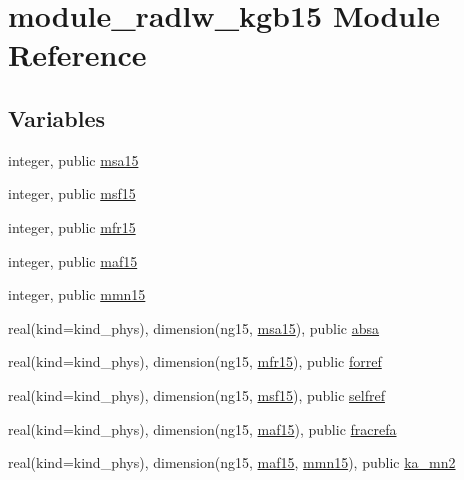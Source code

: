 \hypertarget{namespacemodule__radlw__kgb15}{}\section{module\+\_\+radlw\+\_\+kgb15 Module Reference}
\label{namespacemodule__radlw__kgb15}
\subsection*{Variables}
\begin{DoxyCompactItemize}
\item 
integer, public \hyperlink{namespacemodule__radlw__kgb15_abb9e98034166a07a6e349631d7fbb2a3}{msa15}
\item 
integer, public \hyperlink{group__module__radlw__main_gae1b588ee60974c2d451c89f842601e07}{msf15}
\item 
integer, public \hyperlink{group__module__radlw__main_gad4d78009d0c7ffa27dbb228e68307675}{mfr15}
\item 
integer, public \hyperlink{group__module__radlw__main_ga482858cf08fb1a14117dfbaa6a57fe8c}{maf15}
\item 
integer, public \hyperlink{group__module__radlw__main_ga8ab45999cfc7b9db0f3d3b61ccf803e8}{mmn15}
\item 
real(kind=kind\+\_\+phys), dimension(ng15, \hyperlink{namespacemodule__radlw__kgb15_abb9e98034166a07a6e349631d7fbb2a3}{msa15}), public \hyperlink{group__module__radlw__main_gaa6412ac501e2afed3d1b64b0cdcdab9e}{absa}
\item 
real(kind=kind\+\_\+phys), dimension(ng15, \hyperlink{group__module__radlw__main_gad4d78009d0c7ffa27dbb228e68307675}{mfr15}), public \hyperlink{group__module__radlw__main_gada70146d20f89f059141aa4cf58a0894}{forref}
\item 
real(kind=kind\+\_\+phys), dimension(ng15, \hyperlink{group__module__radlw__main_gae1b588ee60974c2d451c89f842601e07}{msf15}), public \hyperlink{group__module__radlw__main_ga1d14e9b2e607f2022d84c6fc0cd27c4e}{selfref}
\item 
real(kind=kind\+\_\+phys), dimension(ng15, \hyperlink{group__module__radlw__main_ga482858cf08fb1a14117dfbaa6a57fe8c}{maf15}), public \hyperlink{group__module__radlw__main_ga4b5c5f6fd9ea806843adf78ec1b43cd2}{fracrefa}
\item 
real(kind=kind\+\_\+phys), dimension(ng15, \hyperlink{group__module__radlw__main_ga482858cf08fb1a14117dfbaa6a57fe8c}{maf15}, \hyperlink{group__module__radlw__main_ga8ab45999cfc7b9db0f3d3b61ccf803e8}{mmn15}), public \hyperlink{group__module__radlw__main_gaff32d89fe8fef50ff79136cc7aa50526}{ka\+\_\+mn2}
\end{DoxyCompactItemize}


